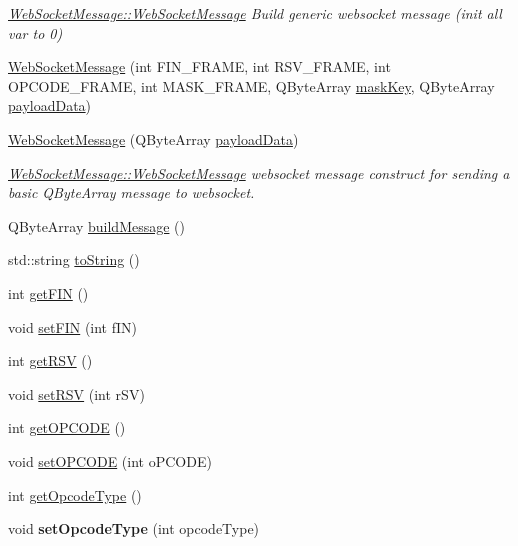 \begin{DoxyCompactItemize}
\begin{DoxyCompactList}\small\item\em \hyperlink{class_web_socket_message_a9ccef692ce81b78f9cabafb2ff0db849}{Web\-Socket\-Message\-::\-Web\-Socket\-Message} Build generic websocket message (init all var to 0) \end{DoxyCompactList}\item 
\hyperlink{class_web_socket_message_aa0b68263ff13e67f0d4725eea7b72dd1}{Web\-Socket\-Message} (int F\-I\-N\-\_\-\-F\-R\-A\-M\-E, int R\-S\-V\-\_\-\-F\-R\-A\-M\-E, int O\-P\-C\-O\-D\-E\-\_\-\-F\-R\-A\-M\-E, int M\-A\-S\-K\-\_\-\-F\-R\-A\-M\-E, Q\-Byte\-Array \hyperlink{class_web_socket_message_a0b0651e073c2998a609434e84fdb771d}{mask\-Key}, Q\-Byte\-Array \hyperlink{class_web_socket_message_a99b2d16c9a26451b2655f7959ba8b4a1}{payload\-Data})
\item 
\hyperlink{class_web_socket_message_ac4cb680a33387642b10929d3746c8768}{Web\-Socket\-Message} (Q\-Byte\-Array \hyperlink{class_web_socket_message_a99b2d16c9a26451b2655f7959ba8b4a1}{payload\-Data})
\begin{DoxyCompactList}\small\item\em \hyperlink{class_web_socket_message_a9ccef692ce81b78f9cabafb2ff0db849}{Web\-Socket\-Message\-::\-Web\-Socket\-Message} websocket message construct for sending a basic Q\-Byte\-Array message to websocket. \end{DoxyCompactList}\item 
Q\-Byte\-Array \hyperlink{class_web_socket_message_a8c27322a68b20d519f01a08f16fc46ef}{build\-Message} ()
\item 
std\-::string \hyperlink{class_web_socket_message_aae427931c26114a4e6c11d5731fd951f}{to\-String} ()
\item 
int \hyperlink{class_web_socket_message_a1ea8659884b107b9f718fe4c10acdd23}{get\-F\-I\-N} ()
\item 
void \hyperlink{class_web_socket_message_abfca2c154c7a4d7e79557501ee109770}{set\-F\-I\-N} (int f\-I\-N)
\item 
int \hyperlink{class_web_socket_message_a99bf7711de5832324588c8647267a3f5}{get\-R\-S\-V} ()
\item 
void \hyperlink{class_web_socket_message_a35d0874974d06a305adce10cfed64f0e}{set\-R\-S\-V} (int r\-S\-V)
\item 
int \hyperlink{class_web_socket_message_adb31f0f68158518b11067cee488e9588}{get\-O\-P\-C\-O\-D\-E} ()
\item 
void \hyperlink{class_web_socket_message_a9517ba4f7b8834a35f6af08baae3163a}{set\-O\-P\-C\-O\-D\-E} (int o\-P\-C\-O\-D\-E)
\item 
int \hyperlink{class_web_socket_message_a525d0ca0584591009826bb572fdc2bb9}{get\-Opcode\-Type} ()
\item 
\hypertarget{class_web_socket_message_a991b3a0716aef119a41f434892ae4d62}{void {\bfseries set\-Opcode\-Type} (int opcode\-Type)}\label{class_web_socket_message_a991b3a0716aef119a41f434892ae4d62}


\end{DoxyCompactItemize}

